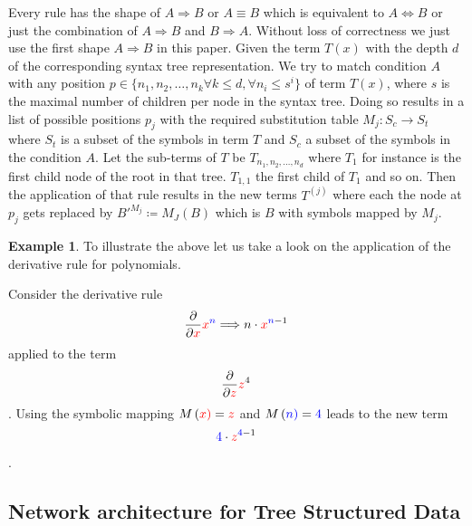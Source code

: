 \documentclass{scrartcl}
\theoremstyle{definition}
\newtheorem{exmp}{Example}[section]
\begin{document}
Every rule has the shape of $A \Longrightarrow B$ or $A \equiv B$ which is equivalent to $A \Longleftrightarrow B$ or just the combination of $A \Longrightarrow B$ and $B \Longrightarrow A$.
Without loss of correctness we just use the first shape $A \Longrightarrow B$ in this paper. Given the term $T\left(x\right)$ with the depth $d$ of the corresponding syntax tree representation.
We try to match condition $A$ with any position $p \in \big\{ n_1, n_2, \dots, n_k \forall k \leq d, \forall n_i \leq s^i \big\}$ of term $T\left(x\right)$,
where $s$ is the maximal number of children per node in the syntax tree.
Doing so results in a list of possible positions $p_j$ with the required substitution table $M_j: S_c \to S_t$ where $S_t$ is a subset of the symbols in term $T$ and $S_c$ a subset of the symbols in the condition $A$.
Let the sub-terms of $T$ be $T_{n_1, n_2, \dots, n_d}$ where $T_1$ for instance is the first child node of the root in that tree.
$T_{1,1}$ the first child of $T_1$ and so on.
Then the application of that rule results in the new terms $T^{(j)}$ where each the node at $p_j$ gets replaced by $B'^{M_j} \coloneqq M_J\left( B \right)$ which is $B$ with symbols mapped by $M_j$. 

\begin{exmp}
To illustrate the above let us take a look on the application of the derivative rule for polynomials.

Consider the derivative rule
\begin{align}
	\frac{\partial}{\partial {\color{red}x}} {\color{red}x}^{\color{blue}n} \Longrightarrow n\cdot {\color{red}x}^{{\color{blue}n}-1} 
\end{align}
applied to the term
\begin{align}
	\frac{\partial}{\partial {\color{red}z}} {\color{red}z}^4 
\end{align}.
Using the symbolic mapping ${M\left(\color{red}{x}\right) = \color{red}z}$ and ${M\left(\color{blue}{n} \right) = {\color{blue}4}}$ leads to the new term
\begin{align}
	{\color{blue}4}\cdot {\color{red}z}^{{\color{blue}4}-1} 
\end{align}.

\end{exmp}

\subsection{Network architecture for Tree Structured Data}
\end{document}
